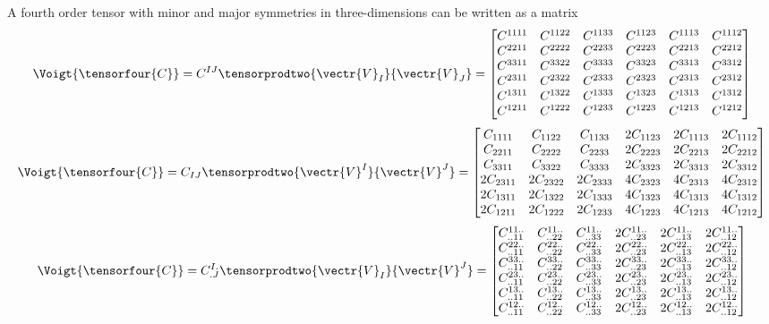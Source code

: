 A fourth order tensor with minor and major symmetries in three-dimensions can be written as a
matrix \ie
\begin{equation}
  \Voigt{\tensorfour{C}}=C^{IJ}\tensorprodtwo{\vectr{V}_{I}}{\vectr{V}_{J}}=\begin{bmatrix}
    C^{1111} & C^{1122} & C^{1133} & C^{1123} & C^{1113} & C^{1112} \\
    C^{2211} & C^{2222} & C^{2233} & C^{2223} & C^{2213} & C^{2212} \\
    C^{3311} & C^{3322} & C^{3333} & C^{3323} & C^{3313} & C^{3312} \\
    C^{2311} & C^{2322} & C^{2333} & C^{2323} & C^{2313} & C^{2312} \\
    C^{1311} & C^{1322} & C^{1333} & C^{1323} & C^{1313} & C^{1312} \\
    C^{1211} & C^{1222} & C^{1233} & C^{1223} & C^{1213} & C^{1212}     
  \end{bmatrix}
\end{equation}
\begin{equation}
  \Voigt{\tensorfour{C}}=C_{IJ}\tensorprodtwo{\vectr{V}^{I}}{\vectr{V}^{J}}=\begin{bmatrix}
    C_{1111} & C_{1122} & C_{1133} & 2C_{1123} & 2C_{1113} & 2C_{1112} \\
    C_{2211} & C_{2222} & C_{2233} & 2C_{2223} & 2C_{2213} & 2C_{2212} \\
    C_{3311} & C_{3322} & C_{3333} & 2C_{3323} & 2C_{3313} & 2C_{3312} \\
    2C_{2311} & 2C_{2322} & 2C_{2333} & 4C_{2323} & 4C_{2313} & 4C_{2312} \\
    2C_{1311} & 2C_{1322} & 2C_{1333} & 4C_{1323} & 4C_{1313} & 4C_{1312} \\
    2C_{1211} & 2C_{1222} & 2C_{1233} & 4C_{1223} & 4C_{1213} & 4C_{1212}     
  \end{bmatrix}
\end{equation}
\begin{equation}
  \Voigt{\tensorfour{C}}=C^{I.}_{.J}\tensorprodtwo{\vectr{V}_{I}}{\vectr{V}^{J}}=\begin{bmatrix}
    C^{11..}_{..11} & C^{11..}_{..22} & C^{11..}_{..33} & 2C^{11..}_{..23} & 2C^{11..}_{..13} & 2C^{11..}_{..12} \\
    C^{22..}_{..11} & C^{22..}_{..22} & C^{22..}_{..33} & 2C^{22..}_{..23} & 2C^{22..}_{..13} & 2C^{22..}_{..12} \\
    C^{33..}_{..11} & C^{33..}_{..22} & C^{33..}_{..33} & 2C^{33..}_{..23} & 2C^{33..}_{..13} & 2C^{33..}_{..12} \\
    C^{23..}_{..11} & C^{23..}_{..22} & C^{23..}_{..33} & 2C^{23..}_{..23} & 2C^{23..}_{..13} & 2C^{23..}_{..12} \\
    C^{13..}_{..11} & C^{13..}_{..22} & C^{13..}_{..33} & 2C^{13..}_{..23} & 2C^{13..}_{..13} & 2C^{13..}_{..12} \\
    C^{12..}_{..11} & C^{12..}_{..22} & C^{12..}_{..33} & 2C^{12..}_{..23} & 2C^{12..}_{..13} & 2C^{12..}_{..12}     
  \end{bmatrix}
\end{equation}
